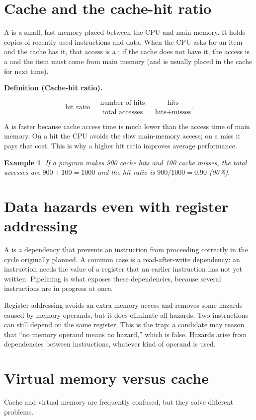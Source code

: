 \documentclass[11pt]{article}
\newtheorem{example}{Example}[section]
\newenvironment{definitionbox}[1]{%
  \par\noindent\textbf{Definition (#1).}\ \itshape
}{\par\vspace{0.3em}}
\begin{document}
\section{Cache and the cache-hit ratio}
A  is a small, fast memory placed between the CPU and main memory.
It holds copies of recently used instructions and data. When the CPU asks for
an item and the cache has it, that access is a ; if the cache does not
have it, the access is a  and the item must come from main memory
(and is usually placed in the cache for next time).

\begin{definitionbox}{Cache-hit ratio}
\[
\text{hit ratio} = \frac{\text{number of hits}}{\text{total accesses}}
= \frac{\text{hits}}{\text{hits} + \text{misses}}.
\]
\end{definitionbox}

A  is faster because cache access time is much lower than the access
time of main memory. On a hit the CPU avoids the slow main-memory access; on
a miss it pays that cost. This is why a higher hit ratio improves average
performance.

\begin{example}
If a program makes 900 cache hits and 100 cache misses, the total accesses
are $900+100=1000$ and the hit ratio is $900/1000 = 0.90$ (90\%).
\end{example}

\section{Data hazards even with register addressing}
A  is a dependency that prevents an instruction from
proceeding correctly in the cycle originally planned. A common case is a
read-after-write dependency: an instruction needs the value of a register
that an earlier instruction has not yet written. Pipelining is what exposes
these dependencies, because several instructions are in progress at once.

Register addressing avoids an extra memory access and removes some hazards
caused by memory operands, but it does  eliminate all hazards. Two
instructions can still depend on the same register. This is the trap: a
candidate may reason that ``no memory operand means no hazard,'' which is
false. Hazards arise from dependencies between instructions, whatever kind of
operand is used.

\section{Virtual memory versus cache}
Cache and virtual memory are frequently confused, but they solve different
problems.
\end{document}

